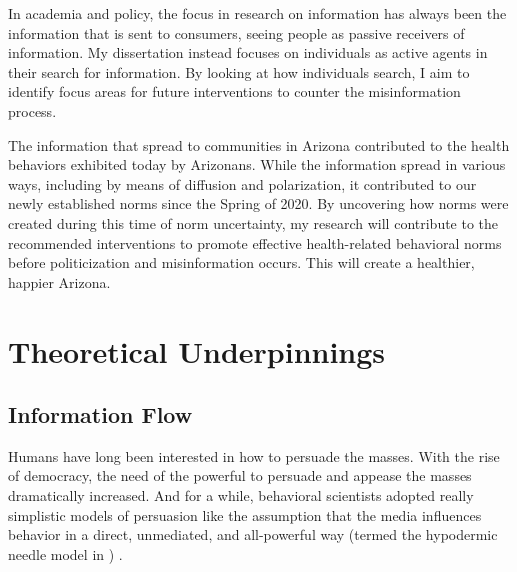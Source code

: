 In academia and policy, the focus in research on information has always
been the information that is sent to consumers, seeing people as passive
receivers of information. My dissertation instead focuses on individuals as
active agents in their search for information. By looking at how individuals 
search, I aim to identify focus areas for future interventions
to counter the misinformation process.

The information that spread to communities in Arizona contributed to the health
behaviors exhibited today by Arizonans. While the information spread in various
ways, including by means of diffusion and polarization, it contributed to our newly
established norms since the Spring of 2020. By uncovering how norms were
created during this time of norm uncertainty, my research will contribute to the
recommended interventions to promote effective health-related behavioral norms
before politicization and misinformation occurs. This will create a healthier,
happier Arizona.

\section{Theoretical Underpinnings}

\subsection{Information Flow}
Humans have long been interested in how to persuade the masses. With the 
rise of democracy, the need of the powerful to persuade and appease the
masses dramatically increased. And for a while, behavioral scientists 
adopted really simplistic models of persuasion like the assumption
that the media influences behavior in a direct, unmediated, and 
all-powerful way (termed the hypodermic needle model in
\citet{bineham1988historical}) \citep{lasswellpropaganda}. 

